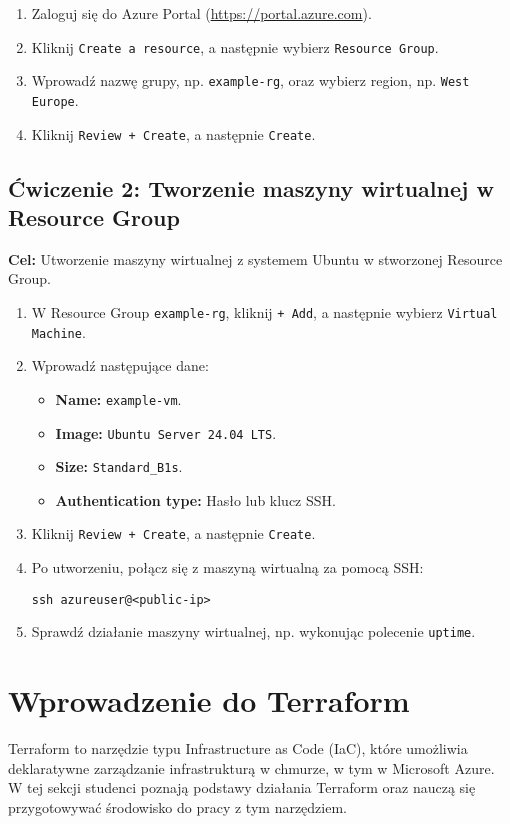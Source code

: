 \documentclass{article}
\begin{document}
\begin{enumerate}
    \item Zaloguj się do Azure Portal (\url{https://portal.azure.com}).
    \item Kliknij \texttt{Create a resource}, a następnie wybierz \texttt{Resource Group}.
    \item Wprowadź nazwę grupy, np. \texttt{example-rg}, oraz wybierz region, np. \texttt{West Europe}.
    \item Kliknij \texttt{Review + Create}, a następnie \texttt{Create}.
\end{enumerate}

\subsection{Ćwiczenie 2: Tworzenie maszyny wirtualnej w Resource Group}
\textbf{Cel:} Utworzenie maszyny wirtualnej z systemem Ubuntu w stworzonej Resource Group.

\begin{enumerate}
    \item W Resource Group \texttt{example-rg}, kliknij \texttt{+ Add}, a następnie wybierz \texttt{Virtual Machine}.
    \item Wprowadź następujące dane:
    \begin{itemize}
        \item \textbf{Name:} \texttt{example-vm}.
        \item \textbf{Image:} \texttt{Ubuntu Server 24.04 LTS}.
        \item \textbf{Size:} \texttt{Standard\_B1s}.
        \item \textbf{Authentication type:} Hasło lub klucz SSH.
    \end{itemize}
    \item Kliknij \texttt{Review + Create}, a następnie \texttt{Create}.
    \item Po utworzeniu, połącz się z maszyną wirtualną za pomocą SSH:
    \begin{lstlisting}
ssh azureuser@<public-ip>
    \end{lstlisting}
    \item Sprawdź działanie maszyny wirtualnej, np. wykonując polecenie \texttt{uptime}.
\end{enumerate}


\section{Wprowadzenie do Terraform}
Terraform to narzędzie typu Infrastructure as Code (IaC), które umożliwia deklaratywne zarządzanie infrastrukturą w chmurze, w tym w Microsoft Azure. W tej sekcji studenci poznają podstawy działania Terraform oraz nauczą się przygotowywać środowisko do pracy z tym narzędziem.
\end{document}
